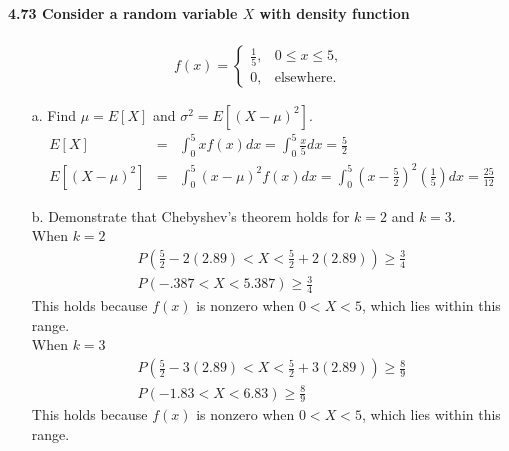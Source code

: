 \documentclass{article}
\begin{document}
\paragraph{4.73 Consider a random variable $X$ with density function}
\begin{eqnarray*}
f(x)=\left\{\begin{array}{ll}
	\frac{1}{5},& 0\leq x\leq 5,\\
	0, & \mbox{elsewhere.}
	\end{array}\right.
\end{eqnarray*}
\begin{enumerate}
\item[a.] Find $\mu=E[X]$ and $\sigma^2 = E[(X-\mu)^2]$.
\begin{eqnarray*}
E[X] & = & \int_0^5 xf(x)dx = \int_0^5 \frac{x}{5}dx = \boxed{\frac{5}{2}}\\
E[(X-\mu)^2] & = & \int_0^5 (x-\mu)^2f(x)dx = 
	\int_0^5 \left(x-\frac{5}{2}\right)^2\left(\frac{1}{5}\right)dx = 
		\boxed{\frac{25}{12}}
\end{eqnarray*}

\item[b.] Demonstrate that Chebyshev's theorem holds for $k=2$ and $k=3$.\\
When $k=2$
\begin{eqnarray*}
P\left(\frac{5}{2}-2(2.89)<X<\frac{5}{2}+2(2.89)\right) \geq \frac{3}{4}\\
P(-.387<X<5.387) \geq \frac{3}{4}
\end{eqnarray*}
This holds because $f(x)$ is nonzero when $0<X<5$, which lies within this range.\\
When $k=3$
\begin{eqnarray*}
P\left(\frac{5}{2}-3(2.89)<X<\frac{5}{2}+3(2.89)\right) \geq \frac{8}{9}\\
P(-1.83<X<6.83) \geq \frac{8}{9}
\end{eqnarray*}
This holds because $f(x)$ is nonzero when $0<X<5$, which lies within this range.

\end{enumerate}
\end{document}
